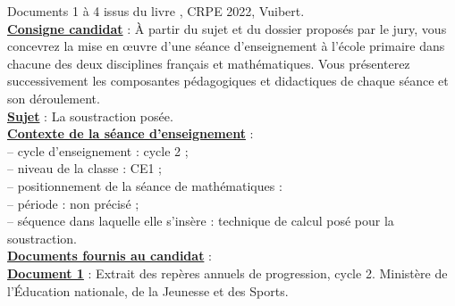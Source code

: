 \activites

\textcolor{G1}{Documents 1 à 4 issus du livre  \fg, CRPE 2022, Vuibert.} \\

{\bf\uline{Consigne candidat}} : À partir du sujet et du dossier proposés par le jury, vous concevrez la mise en œuvre d'une séance d'enseignement à l'école primaire dans chacune des deux disciplines français et mathématiques. Vous présenterez successivement les composantes pédagogiques et didactiques de chaque séance et son déroulement. \\

{\bf\uline{Sujet}} : La soustraction posée. \\

{\bf\uline{Contexte de la séance d'enseignement}} : \\
   \hspace*{5mm} -- cycle d'enseignement : cycle 2 ; \\
   \hspace*{5mm} -- niveau de la classe : CE1 ; \\
   \hspace*{5mm} -- positionnement de la séance de mathématiques : \\
      \hspace*{10mm} -- période : non précisé ; \\
      \hspace*{10mm} -- séquence dans laquelle elle s'insère : technique de calcul posé pour la soustraction. \\ [10mm]

{\bf\uline{Documents fournis au candidat}} : \\

{\bf\uline{Document 1}} : Extrait des repères annuels de progression, cycle 2. Ministère de l'Éducation nationale, de la Jeunesse et des Sports.

